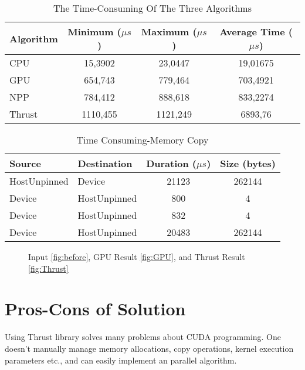 \documentclass[11pt]{article} %
\begin{document}
	\begin{table}[H] %
		\centering		
		\caption[The Time-Consuming Of The Three Algorithms]{ The Time-Consuming Of The Three Algorithms }
		\label{tab:table_1}	
		\begin{tabular}{l c c c}
			Algorithm & Minimum ($\mu s$) & Maximum ($\mu s$) & Average Time ($\mu s$) \\ \hline
			CPU &	15,3902	&	23,0447	&	19,01675	 \\ 
			GPU & 	654,743	&	779,464	&	703,4921	\\ 
			NPP & 	784,412	&	888,618	&	833,2274   \\  
			Thrust&	1110,455&	1121,249&	6893,76 	\\ 
		\end{tabular}
	\end{table}
\hfill
	\begin{table}[htbp]
		\centering
		\caption{Time Consuming-Memory Copy}
		\label{tab:table_2}%
		\begin{tabular}{llc c}
			Source & Destination & \multicolumn{1}{l}{Duration ($\mu s$)} & \multicolumn{1}{l}{Size (bytes)} \\\hline  
			HostUnpinned & Device & 21123 & 262144 \\  	
			Device & HostUnpinned & 800  & 4 \\
			Device & HostUnpinned & 832   & 4 \\
			Device & HostUnpinned & 20483 & 262144 \\
		\end{tabular}%
	\end{table}%
\hfill
	\begin{figure}
		\centering
		\hfill
		\hfill
		\caption{Input \ref{fig:before}, GPU Result \ref{fig:GPU}, and Thrust Result \ref{fig:Thrust} }
	\end{figure}
	
\section{Pros-Cons of Solution}
	\justifying Using Thrust library solves many problems about CUDA programming. One doesn't manually manage memory allocations, copy operations, kernel execution parameters etc., and  can easily implement an parallel algorithm.  \\
	
\end{document}
